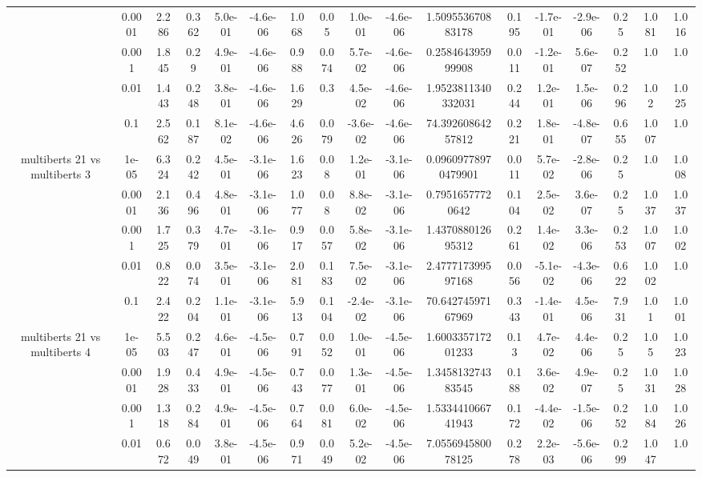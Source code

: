 \begin{tabular}{|c|c|c|c|c|c|c|c|c|c|c|c|c|c|c|c|c|}
 & 0.0001 & 2.286 & 0.362 & 5.0e-01 & -4.6e-06 & 1.068 & 0.05 & 1.0e-01 & -4.6e-06 & 1.509553670883178 & 0.195 & -1.7e-01 & -2.9e-06 & 0.25 & 1.081 & 1.016 \\
 & 0.001 & 1.845 & 0.29 & 4.9e-01 & -4.6e-06 & 0.988 & 0.074 & 5.7e-02 & -4.6e-06 & 0.258464395999908 & 0.011 & -1.2e-01 & 5.6e-07 & 0.252 & 1.0 & 1.0 \\
 & 0.01 & 1.443 & 0.248 & 3.8e-01 & -4.6e-06 & 1.629 & 0.3 & 4.5e-02 & -4.6e-06 & 1.9523811340332031 & 0.244 & 1.2e-01 & 1.5e-06 & 0.296 & 1.02 & 1.025 \\
 & 0.1 & 2.562 & 0.187 & 8.1e-02 & -4.6e-06 & 4.626 & 0.079 & -3.6e-02 & -4.6e-06 & 74.39260864257812 & 0.221 & 1.8e-01 & -4.8e-07 & 0.655 & 1.007 & 1.0 \\
\hline
\multirow{5}{*}{multiberts 21 vs multiberts 3} & 1e-05 & 6.324 & 0.242 & 4.5e-01 & -3.1e-06 & 1.623 & 0.08 & 1.2e-01 & -3.1e-06 & 0.09609778970479901 & 0.011 & 5.7e-02 & -2.8e-06 & 0.25 & 1.0 & 1.008 \\
 & 0.0001 & 2.136 & 0.496 & 4.8e-01 & -3.1e-06 & 1.077 & 0.08 & 8.8e-02 & -3.1e-06 & 0.79516577720642 & 0.104 & 2.5e-02 & 3.6e-07 & 0.25 & 1.037 & 1.037 \\
 & 0.001 & 1.725 & 0.379 & 4.7e-01 & -3.1e-06 & 0.917 & 0.057 & 5.8e-02 & -3.1e-06 & 1.437088012695312 & 0.261 & 1.4e-02 & 3.3e-06 & 0.253 & 1.007 & 1.002 \\
 & 0.01 & 0.822 & 0.074 & 3.5e-01 & -3.1e-06 & 2.081 & 0.183 & 7.5e-02 & -3.1e-06 & 2.477717399597168 & 0.056 & -5.1e-02 & -4.3e-06 & 0.622 & 1.002 & 1.0 \\
 & 0.1 & 2.422 & 0.204 & 1.1e-01 & -3.1e-06 & 5.913 & 0.104 & -2.4e-02 & -3.1e-06 & 70.64274597167969 & 0.343 & -1.4e-01 & 4.5e-06 & 7.931 & 1.01 & 1.001 \\
\hline
\multirow{5}{*}{multiberts 21 vs multiberts 4} & 1e-05 & 5.503 & 0.247 & 4.6e-01 & -4.5e-06 & 0.791 & 0.052 & 1.0e-01 & -4.5e-06 & 1.600335717201233 & 0.13 & 4.7e-02 & 4.4e-06 & 0.25 & 1.05 & 1.023 \\
 & 0.0001 & 1.928 & 0.433 & 4.9e-01 & -4.5e-06 & 0.743 & 0.077 & 1.3e-01 & -4.5e-06 & 1.345813274383545 & 0.188 & 3.6e-02 & 4.9e-07 & 0.25 & 1.031 & 1.028 \\
 & 0.001 & 1.318 & 0.284 & 4.9e-01 & -4.5e-06 & 0.764 & 0.081 & 6.0e-02 & -4.5e-06 & 1.533441066741943 & 0.172 & -4.4e-02 & -1.5e-06 & 0.252 & 1.084 & 1.026 \\
 & 0.01 & 0.672 & 0.049 & 3.8e-01 & -4.5e-06 & 0.971 & 0.049 & 5.2e-02 & -4.5e-06 & 7.055694580078125 & 0.278 & 2.2e-03 & -5.6e-06 & 0.299 & 1.047 & 1.0 \\

\end{tabular}
